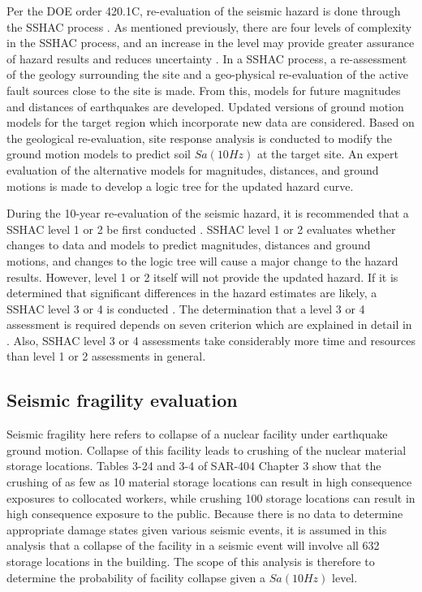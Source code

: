 \documentclass[3p]{elsarticle}
\begin{document}
Per the DOE order 420.1C, re-evaluation of the seismic hazard is done through the SSHAC process . As mentioned previously, there are four levels of complexity in the SSHAC process, and an increase in the level may provide greater assurance of hazard results and reduces uncertainty \cite{Coppersmith2012}. In a SSHAC process, a re-assessment of the geology surrounding the site and a geo-physical re-evaluation of the active fault sources close to the site is made. From this, models for future magnitudes and distances of earthquakes are developed. Updated versions of ground motion models for the target region which incorporate new data are considered. Based on the geological re-evaluation, site response analysis is conducted to modify the ground motion models to predict soil $Sa(10Hz)$ at the target site. An expert evaluation of the alternative models for magnitudes, distances, and ground motions is made to develop a logic tree for the updated hazard curve.

During the 10-year re-evaluation of the seismic hazard, it is recommended that a SSHAC level 1 or 2 be first conducted \cite{Ake2018}. SSHAC level 1 or 2 evaluates whether changes to data and models to predict magnitudes, distances and ground motions, and changes to the logic tree will cause a major change to the hazard results. However, level 1 or 2 itself will not provide the updated hazard. If it is determined that significant differences in the hazard estimates are likely, a SSHAC level 3 or 4 is conducted \cite{Coppersmith2012, Kammerer2012}. The determination that a level 3 or 4 assessment is required depends on seven criterion which are explained in detail in \cite{Kammerer2015}. Also, SSHAC level 3 or 4 assessments take considerably more time and resources than level 1 or 2 assessments in general.

\subsection{Seismic fragility evaluation}

Seismic fragility here refers to collapse of a nuclear facility under earthquake ground motion. Collapse of this facility leads to crushing of the nuclear material storage locations. Tables 3-24 and 3-4 of SAR-404 Chapter 3 \cite{SAR2013} show that the crushing of as few as 10 material storage locations can result in high consequence exposures to collocated workers, while crushing 100 storage locations can result in high consequence exposure to the public. Because there is no data to determine appropriate damage states given various seismic events, it is assumed in this analysis that a collapse of the facility in a seismic event will involve all 632 storage locations in the building. The scope of this analysis is therefore to determine the probability of facility collapse given a $Sa(10Hz)$ level.
\end{document}
